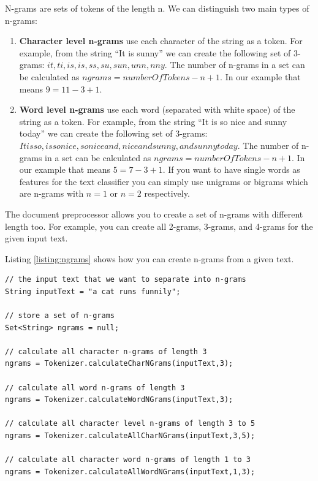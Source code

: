 \documentclass[a4paper,twoside]{book}      %
\begin{document}
N-grams are sets of tokens of the length n. We can distinguish two main types of n-grams:

\begin{enumerate}
\item \textbf{Character level n-grams} use each character of the string as a token. For example, from the string ``It is sunny'' we can create the following set of 3-grams: ${it ,t i, is,is ,s s, su,sun,unn,nny}$. The number of n-grams in a set can be calculated as $ngrams = numberOfTokens - n + 1$. In our example that means $9 = 11 - 3 + 1$.
\item \textbf{Word level n-grams} use each word (separated with white space) of the string as a token. For example, from the string ``It is so nice and sunny today'' we can create the following set of 3-grams: ${It is so,is so nice,so nice and,nice and sunny,and sunny today}$. The number of n-grams in a set can be calculated as $ngrams = numberOfTokens - n + 1$. In our example that means $5 = 7 - 3 + 1$. If you want to have single words as features for the text classifier you can simply use unigrams or bigrams which are n-grams with $n=1$ or $n=2$ respectively.
\end{enumerate}

The document preprocessor allows you to create a set of n-grams with different length too. For example, you can create all 2-grams, 3-grams, and 4-grams for the given input text.

Listing \ref{listing:ngrams} shows how you can create n-grams from a given text.

\begin{codelisting}
\label{listing:ngrams}
\begin{lstlisting}[label=listing:ngrams,caption=Creating n-grams.,frame=tb]
// the input text that we want to separate into n-grams
String inputText = "a cat runs funnily";

// store a set of n-grams
Set<String> ngrams = null;

// calculate all character n-grams of length 3
ngrams = Tokenizer.calculateCharNGrams(inputText,3);

// calculate all word n-grams of length 3
ngrams = Tokenizer.calculateWordNGrams(inputText,3);

// calculate all character level n-grams of length 3 to 5
ngrams = Tokenizer.calculateAllCharNGrams(inputText,3,5);

// calculate all character word n-grams of length 1 to 3
ngrams = Tokenizer.calculateAllWordNGrams(inputText,1,3);
\end{lstlisting}
\end{codelisting}
\end{document}
